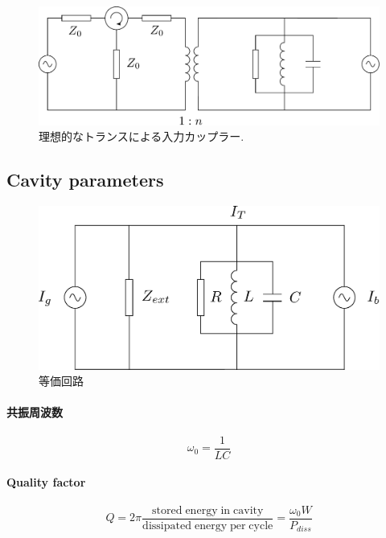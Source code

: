 \documentclass[book]{jlreq}
\begin{document}
\begin{figure}[hbt]
    \begin{center}
      \includegraphics[width=12cm,clip]{figs/Cavity_Model.pdf}
      \caption{理想的なトランスによる入力カップラー.}
     \label{Cavity_Model}
    \end{center}
\end{figure}

\subsection{Cavity parameters}

\begin{figure}[hbt]
    \begin{center}
      \includegraphics[width=12cm,clip]{figs/Equivalent_Circuit}
      \caption{等価回路}
     \label{Equivalent_Circuit}
    \end{center}
\end{figure}
%
\paragraph{共振周波数}
%
\begin{equation}
    \omega_0 = \frac{1}{L C}
\end{equation}
%
\paragraph{Quality factor}
%
\begin{equation}
    Q = 2\pi \frac{\mathrm{stored\;energy\;in\;cavity}}{\mathrm{dissipated \; energy\;per\;cycle}} = \frac{\omega_0 W}{P_{diss}}
\end{equation}
%
\end{document}
